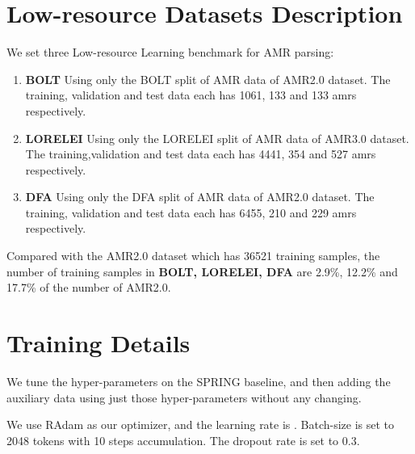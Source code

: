 \documentclass[11pt]{article}
\begin{document}
\section{Low-resource Datasets Description}
\label{app:few-shots}
 We set three Low-resource Learning benchmark for AMR parsing:
 \begin{enumerate}
     \item  \textbf{BOLT} Using only the BOLT split of AMR data of AMR2.0 dataset. The training, validation and test data each has 1061, 133 and 133 amrs respectively.
     \item  \textbf{LORELEI} Using only the LORELEI split of AMR data of AMR3.0 dataset. The training,validation and test data each has 4441, 354 and 527 amrs respectively. 
     \item \textbf{DFA} Using only the DFA split of AMR data of AMR2.0 dataset. The training, validation and test data each has 6455, 210 and 229 amrs respectively.
 \end{enumerate}
 Compared with the AMR2.0 dataset which has 36521 training samples, the number of training samples in \textbf{BOLT, LORELEI, DFA} are 2.9\%, 12.2\% and 17.7\% of the number of AMR2.0.


 
\section{Training Details}
\label{training_details}
 We tune the hyper-parameters on the SPRING baseline, and then adding the auxiliary data using just those hyper-parameters without any changing.

We use RAdam \citep{liu-RAdam} as our optimizer, and the learning rate is . Batch-size is set to 2048 tokens with 10 steps accumulation. The dropout rate is set to 0.3.

\begin{table}[h]
    \centering
    \footnotesize
    \caption{Hyper-parameters searching space}

    \label{tab:ood}
\end{table}
\end{document}
